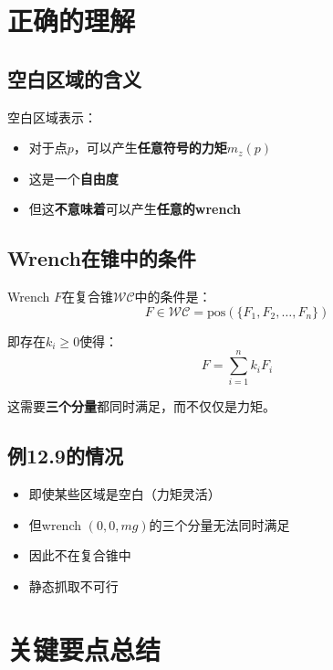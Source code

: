 \documentclass[12pt,a4paper]{article}
\begin{document}
\section{正确的理解}

\subsection{空白区域的含义}

空白区域表示：
\begin{itemize}
    \item 对于点$p$，可以产生\textbf{任意符号的力矩}$m_z(p)$
    \item 这是一个\textbf{自由度}
    \item 但这\textbf{不意味着}可以产生\textbf{任意的wrench}
\end{itemize}

\subsection{Wrench在锥中的条件}

Wrench $F$在复合锥$\mathcal{WC}$中的条件是：
\begin{equation}
F \in \mathcal{WC} = \text{pos}(\{F_1, F_2, \ldots, F_n\})
\end{equation}

即存在$k_i \geq 0$使得：
\begin{equation}
F = \sum_{i=1}^n k_i F_i
\end{equation}

这需要\textbf{三个分量}都同时满足，而不仅仅是力矩。

\subsection{例12.9的情况}

\begin{itemize}
    \item 即使某些区域是空白（力矩灵活）
    \item 但wrench $(0, 0, mg)$的三个分量无法同时满足
    \item 因此不在复合锥中
    \item 静态抓取不可行
\end{itemize}

\section{关键要点总结}
\end{document}
